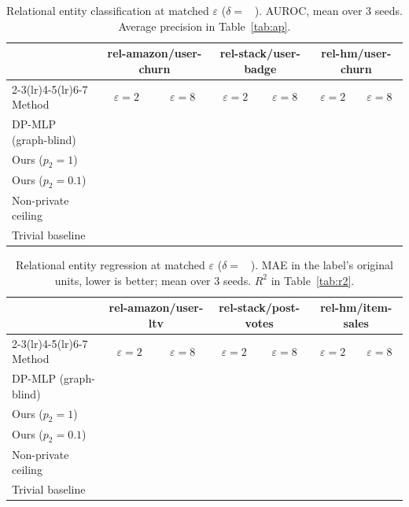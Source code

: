 \documentclass[11pt]{article}
\begin{document}
\begin{table}[H]
\centering\small
\caption{Relational entity classification at matched $\varepsilon$
($\delta = $ \ ). AUROC, mean over 3 seeds. Average precision in
Table~\ref{tab:ap}.}
\label{tab:main-relcls}
\begin{tabular}{lcccccc}
\toprule
& \multicolumn{2}{c}{rel-amazon/user-churn} & \multicolumn{2}{c}{rel-stack/user-badge}
& \multicolumn{2}{c}{rel-hm/user-churn}\\
\cmidrule(lr){2-3}\cmidrule(lr){4-5}\cmidrule(lr){6-7}
Method & $\varepsilon{=}2$ & $\varepsilon{=}8$ & $\varepsilon{=}2$ & $\varepsilon{=}8$
       & $\varepsilon{=}2$ & $\varepsilon{=}8$\\
\midrule
DP-MLP (graph-blind) & & & & & & \\
Ours ($p_2{=}1$)     & & & & & & \\
Ours ($p_2{=}0.1$)   & & & & & & \\
\midrule
Non-private ceiling & \multicolumn{2}{c}{} & \multicolumn{2}{c}{} & \multicolumn{2}{c}{}\\
Trivial baseline    & \multicolumn{2}{c}{} & \multicolumn{2}{c}{} & \multicolumn{2}{c}{}\\
\bottomrule
\end{tabular}
\end{table}

\begin{table}[H]
\centering\small
\caption{Relational entity regression at matched $\varepsilon$
($\delta = $ \ ). MAE in the label's original units, lower is better; mean over
3 seeds. $R^2$ in Table~\ref{tab:r2}.}
\label{tab:main-relreg}
\begin{tabular}{lcccccc}
\toprule
& \multicolumn{2}{c}{rel-amazon/user-ltv} & \multicolumn{2}{c}{rel-stack/post-votes}
& \multicolumn{2}{c}{rel-hm/item-sales}\\
\cmidrule(lr){2-3}\cmidrule(lr){4-5}\cmidrule(lr){6-7}
Method & $\varepsilon{=}2$ & $\varepsilon{=}8$ & $\varepsilon{=}2$ & $\varepsilon{=}8$
       & $\varepsilon{=}2$ & $\varepsilon{=}8$\\
\midrule
DP-MLP (graph-blind) & & & & & & \\
Ours ($p_2{=}1$)     & & & & & & \\
Ours ($p_2{=}0.1$)   & & & & & & \\
\midrule
Non-private ceiling & \multicolumn{2}{c}{} & \multicolumn{2}{c}{} & \multicolumn{2}{c}{}\\
Trivial baseline    & \multicolumn{2}{c}{} & \multicolumn{2}{c}{} & \multicolumn{2}{c}{}\\
\bottomrule
\end{tabular}
\end{table}
\end{document}
